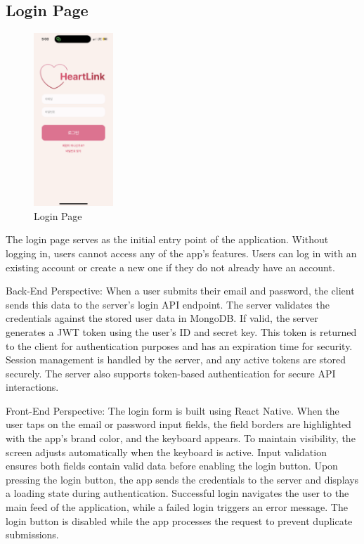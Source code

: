    \subsection{Login Page}
        \begin{figure}[htbp]
            \centerline{\includegraphics[width=3cm]{Images/page/login.png}}
            \caption{Login Page}
            \label{fig}
        \end{figure}
        The login page serves as the initial entry point of the application. Without logging in, users cannot access any of the app's features. Users can log in with an existing account or create a new one if they do not already have an account.
        
        Back-End Perspective: 
        When a user submits their email and password, the client sends this data to the server's login API endpoint. The server validates the credentials against the stored user data in MongoDB. If valid, the server generates a JWT token using the user's ID and secret key. This token is returned to the client for authentication purposes and has an expiration time for security. Session management is handled by the server, and any active tokens are stored securely. The server also supports token-based authentication for secure API interactions. 
        
        Front-End Perspective:
        The login form is built using React Native. When the user taps on the email or password input fields, the field borders are highlighted with the app's brand color, and the keyboard appears. To maintain visibility, the screen adjusts automatically when the keyboard is active. Input validation ensures both fields contain valid data before enabling the login button. Upon pressing the login button, the app sends the credentials to the server and displays a loading state during authentication. Successful login navigates the user to the main feed of the application, while a failed login triggers an error message. The login button is disabled while the app processes the request to prevent duplicate submissions.

